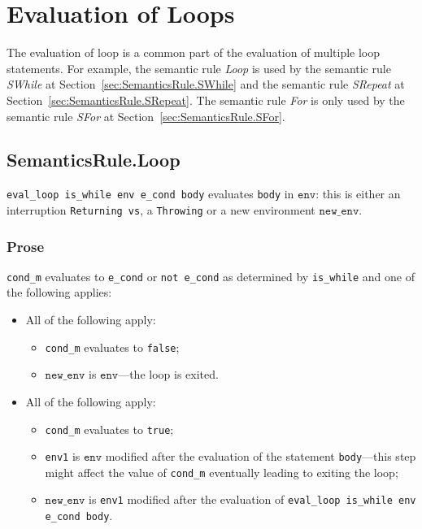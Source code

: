 \documentclass{book}
\newcommand\newenv[0]{\texttt{new\_env}}
\newcommand\env[0]{\texttt{env}}
\begin{document}

\chapter{Evaluation of Loops \label{chap:eval_loops}}

The evaluation of loop is a common part of the evaluation of multiple loop
statements.
%
For example, the semantic rule \emph{Loop} is used by the semantic rule
\emph{SWhile} at Section~\ref{sec:SemanticsRule.SWhile} and the semantic rule
\emph{SRepeat} at Section~\ref{sec:SemanticsRule.SRepeat}.
%
The semantic rule \emph{For} is only used by the semantic rule \emph{SFor} at
Section~\ref{sec:SemanticsRule.SFor}.

\section{SemanticsRule.Loop \label{sec:SemanticsRule.Loop}}
\texttt{eval\_loop is\_while env e\_cond body} evaluates \texttt{body} in
$\env$: this is either an interruption \texttt{Returning vs}, a
\texttt{Throwing} or a new environment $\newenv$.

    \subsection{Prose}
    \texttt{cond\_m} evaluates to \texttt{e\_cond} or \texttt{not e\_cond} as
determined by \texttt{is\_while} and one of the following applies:
    \begin{itemize}
    \item All of the following apply:
      \begin{itemize}
      \item \texttt{cond\_m} evaluates to \texttt{false};
      \item $\newenv$ is $\env$---the loop is exited.
      \end{itemize}
    \item All of the following apply:
      \begin{itemize}
      \item \texttt{cond\_m} evaluates to \texttt{true};
      \item \texttt{env1} is $\env$ modified after the evaluation of the
statement \texttt{body}---this step might affect the value of \texttt{cond\_m}
eventually leading to exiting the loop;
      \item $\newenv$ is \texttt{env1} modified after the evaluation of
\texttt{eval\_loop is\_while env e\_cond body}.
      \end{itemize}
    \end{itemize}
\end{document}

